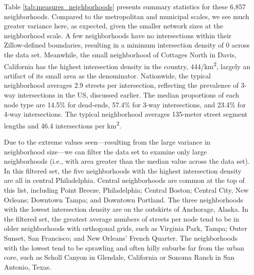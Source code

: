 \documentclass[Afour,sageh,times]{sagej}
\begin{document}
Table \ref{tab:measures_neighborhoods} presents summary statistics for these 6,857 neighborhoods. Compared to the metropolitan and municipal scales, we see much greater variance here, as expected, given the smaller network sizes at the neighborhood scale. A few neighborhoods have no intersections within their Zillow-defined boundaries, resulting in a minimum intersection density of 0 across the data set. Meanwhile, the small neighborhood of Cottages North in Davis, California has the highest intersection density in the country, 444/km\textsuperscript{2}, largely an artifact of its small area as the denominator. Nationwide, the typical neighborhood averages 2.9 streets per intersection, reflecting the prevalence of 3-way intersections in the US, discussed earlier. The median proportions of each node type are 14.5\% for dead-ends, 57.4\% for 3-way intersections, and 23.4\% for 4-way intersections. The typical neighborhood averages 135-meter street segment lengths and 46.4 intersections per km\textsuperscript{2}.

Due to the extreme values seen---resulting from the large variance in neighborhood size---we can filter the data set to examine only large neighborhoods (i.e., with area greater than the median value across the data set). In this filtered set, the five neighborhoods with the highest intersection density are all in central Philadelphia. Central neighborhoods are common at the top of this list, including Point Breeze, Philadelphia; Central Boston; Central City, New Orleans; Downtown Tampa; and Downtown Portland. The three neighborhoods with the lowest intersection density are on the outskirts of Anchorage, Alaska. In the filtered set, the greatest average numbers of streets per node tend to be in older neighborhoods with orthogonal grids, such as Virginia Park, Tampa; Outer Sunset, San Francisco; and New Orleans' French Quarter. The neighborhoods with the lowest tend to be sprawling and often hilly suburbs far from the urban core, such as Scholl Canyon in Glendale, California or Sonoma Ranch in San Antonio, Texas.
\end{document}
